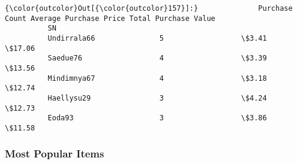 \documentclass[11pt]{article}
\begin{document}
\begin{Verbatim}[commandchars=\\\{\}]
{\color{outcolor}Out[{\color{outcolor}157}]:}              Purchase Count Average Purchase Price Total Purchase Value
          SN                                                                     
          Undirrala66               5                  \$3.41               \$17.06
          Saedue76                  4                  \$3.39               \$13.56
          Mindimnya67               4                  \$3.18               \$12.74
          Haellysu29                3                  \$4.24               \$12.73
          Eoda93                    3                  \$3.86               \$11.58
\end{Verbatim}
            
    \subsubsection{Most Popular Items}\label{most-popular-items}
\end{document}
